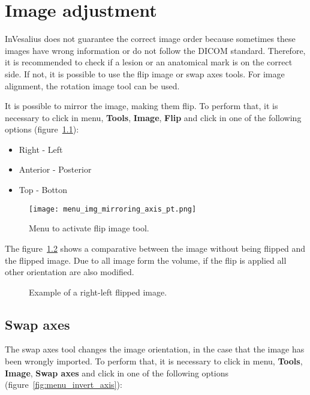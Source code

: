 \chapter{Image adjustment}

InVesalius does not guarantee the correct image order because sometimes these images have wrong information or do not follow the DICOM standard. Therefore, it is recommended to check if a lesion or an anatomical mark is on the correct side. If not, it is possible to use the flip image or swap axes tools. For image alignment, the rotation image tool can be used.

It is possible to mirror the image, making them flip. To perform that, it is necessary to click in menu, \textbf{Tools}, \textbf{Image}, \textbf{Flip} and click in one of the following options (figure~\ref{fig:menu_img_mirroring_axis_pt}):

\begin{itemize}
	\item Right - Left
	\item Anterior - Posterior
	\item Top - Botton
\end{itemize}

\begin{figure}[!htb]
\centering
\texttt{[image: menu\_img\_mirroring\_axis\_pt.png]}
\caption{Menu to activate flip image tool.}
\label{fig:menu_img_mirroring_axis_pt}
\end{figure}


The figure~\ref{fig:mirrored} shows a comparative between the image without being flipped and the flipped image. Due to all image form the volume, if the flip is applied all other orientation are also modified.

\begin{figure}[!htb]
  \centering
    \qquad
  \hfill
  \caption{Example of a right-left flipped image.}
  \label{fig:mirrored}
\end{figure}

\section{Swap axes}

The swap axes tool changes the image orientation, in the case that the image has been wrongly imported. To perform that, it is necessary to click in menu, \textbf{Tools}, \textbf{Image}, \textbf{Swap axes} and click in one of the following options (figure~\ref{fig:menu_invert_axis}):

